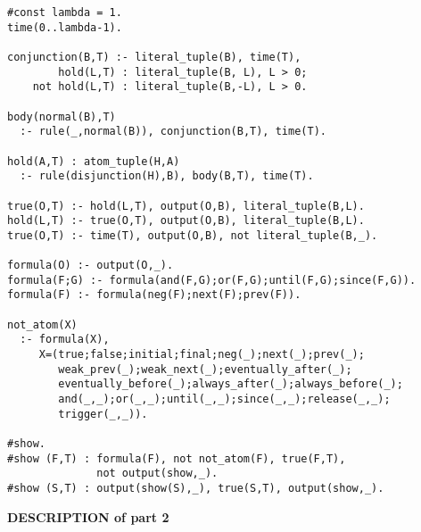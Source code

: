 \begin{center}
\begin{minipage}{\linewidth}
\begin{lstlisting}[language=clingo, label={meta-telingo-one}]
#const lambda = 1.
time(0..lambda-1).

conjunction(B,T) :- literal_tuple(B), time(T),
        hold(L,T) : literal_tuple(B, L), L > 0;
    not hold(L,T) : literal_tuple(B,-L), L > 0.

body(normal(B),T) 
  :- rule(_,normal(B)), conjunction(B,T), time(T).

hold(A,T) : atom_tuple(H,A)   
  :- rule(disjunction(H),B), body(B,T), time(T).

true(O,T) :- hold(L,T), output(O,B), literal_tuple(B,L).
hold(L,T) :- true(O,T), output(O,B), literal_tuple(B,L).
true(O,T) :- time(T), output(O,B), not literal_tuple(B,_).

formula(O) :- output(O,_).
formula(F;G) :- formula(and(F,G);or(F,G);until(F,G);since(F,G)).
formula(F) :- formula(neg(F);next(F);prev(F)).

not_atom(X)
  :- formula(X), 
     X=(true;false;initial;final;neg(_);next(_);prev(_);
        weak_prev(_);weak_next(_);eventually_after(_);
        eventually_before(_);always_after(_);always_before(_);
        and(_,_);or(_,_);until(_,_);since(_,_);release(_,_);
        trigger(_,_)).

#show.
#show (F,T) : formula(F), not not_atom(F), true(F,T), 
              not output(show,_).
#show (S,T) : output(show(S),_), true(S,T), output(show,_).
\end{lstlisting}
\end{minipage}
\end{center}

\textbf{DESCRIPTION of part 2}

